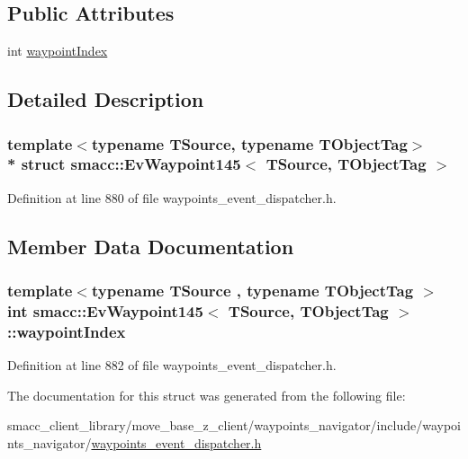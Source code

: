 \subsection*{Public Attributes}
\begin{DoxyCompactItemize}
\item 
int \hyperlink{structsmacc_1_1EvWaypoint145_aaf8620b5261d6150507c1d82b563ac1a}{waypoint\+Index}
\end{DoxyCompactItemize}


\subsection{Detailed Description}
\subsubsection*{template$<$typename T\+Source, typename T\+Object\+Tag$>$\\*
struct smacc\+::\+Ev\+Waypoint145$<$ T\+Source, T\+Object\+Tag $>$}



Definition at line 880 of file waypoints\+\_\+event\+\_\+dispatcher.\+h.



\subsection{Member Data Documentation}
\subsubsection[{\texorpdfstring{waypoint\+Index}{waypointIndex}}]{\setlength{\rightskip}{0pt plus 5cm}template$<$typename T\+Source , typename T\+Object\+Tag $>$ int {\bf smacc\+::\+Ev\+Waypoint145}$<$ T\+Source, T\+Object\+Tag $>$\+::waypoint\+Index}\hypertarget{structsmacc_1_1EvWaypoint145_aaf8620b5261d6150507c1d82b563ac1a}{}\label{structsmacc_1_1EvWaypoint145_aaf8620b5261d6150507c1d82b563ac1a}


Definition at line 882 of file waypoints\+\_\+event\+\_\+dispatcher.\+h.



The documentation for this struct was generated from the following file\+:\begin{DoxyCompactItemize}
\item 
smacc\+\_\+client\+\_\+library/move\+\_\+base\+\_\+z\+\_\+client/waypoints\+\_\+navigator/include/waypoints\+\_\+navigator/\hyperlink{waypoints__event__dispatcher_8h}{waypoints\+\_\+event\+\_\+dispatcher.\+h}\end{DoxyCompactItemize}
